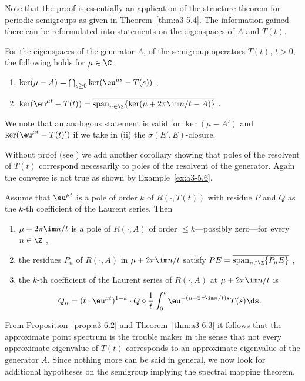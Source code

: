 Note that the proof is essentially an application of the structure theorem for periodic semigroups as given in Theorem~\ref{thm:a3-5.4}.
The information gained there can be reformulated into statements on the eigenspaces of\/ $A$ and $T(t)$.
\begin{corollary}\label{cor:a3-6.4}
For the eigenspaces of the generator $A$, \resp of the semigroup operators $T(t)$, $t > 0$, the following holds  for  $\mu \in \C$ .
\begin{enumerate}[\upshape (i)]
\item 
$\ker(\mu - A) = \bigcap_{s \geq 0} \ker(\eu^{\mu s} - T(s))$ ,

\item 
$\ker(\eu^{\mu t} - T(t)) = \overline{\mathrm{span}_{n \in \Z} \{\ker(\mu + 2\pi\im  n/t - A)\}}$ .

\end{enumerate}
\end{corollary}
We note that an analogous statement is valid for $\ker(\mu - A')$ and $\ker(\eu^{\mu t} - T(t)')$ if we take in (ii) the $\sigma(E',E)$-closure.

Without proof (see \textcite[Proposition~1.10]{greiner:1981}) we add another corollary showing that poles of the resolvent of\/ $T(t)$ correspond necessarily to poles of the resolvent of the generator.
Again the converse is not true as shown by Example~\ref{ex:a3-5.6}.
\begin{corollary}\label{cor:a3-6.5}
Assume that $\eu^{\mu t}$ is a pole of order $k$ of\/ $R(\cdot,T(t))$ with residue $P$ and $Q$ as the $k$-th coefficient of the Laurent series.
Then
\begin{enumerate}[\upshape (i)]
\item 
$\mu + 2\pi\im  n/t$ is a pole of\/ $R(\cdot,A)$ of order $\leq k$---possibly zero---for every $n \in \Z$ ,

\item 
the residues $P_{n}$ of $R(\cdot,A)$ in $\mu + 2\pi\im  n/t$ satisfy $PE = \overline{\text{span}_{n \in \Z} \{P_{n}E\}}$ ,

\item 
the $k$-th coefficient of the Laurent series of\/ $R(\cdot,A)$ at $\mu + 2\pi\im  n/t$ is
\[
Q_{n} = (t \cdot \eu^{\mu t})^{1-k} \cdot Q \circ \frac{1}{t} \int_{0}^{t} \eu^{-(\mu+2\pi\im  n/t)s}T(s) \ds .
\]
\end{enumerate}
\end{corollary}
From Proposition~\ref{prop:a3-6.2} and Theorem~\ref{thm:a3-6.3} it follows that the approximate point spectrum 
is the trouble maker in the sense that not every approximate eigenvalue of\/ $T(t)$ corresponds to an approximate eigenvalue of the generator $A$.
Since nothing more can be said in general, we now look for additional hypotheses on the semigroup implying the spectral mapping theorem.

